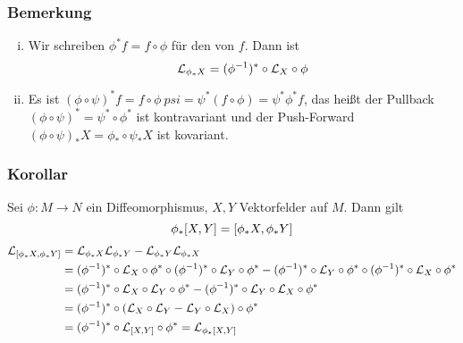 \subsubsection{Bemerkung}
\label{ssub:164}
\begin{enumerate}[(i)]
\item Wir schreiben $\phi^* f = f\circ \phi$ für den  von $f$. Dann ist
\[
\mathcal{L}_{\phi_* X} = (\phi^{-1})^* \circ \mathcal{L}_X \circ \phi
\]
\item Es ist $(\phi\circ \psi)^* f = f\circ \phi\ psi = \psi^*(f\circ \phi) = \psi^* \phi^* f$, das heißt der Pullback $(\phi\circ \psi)^* = \psi^* \circ \phi^*$ ist kontravariant und der Push-Forward $(\phi\circ \psi)_* X = \phi_* \circ \psi_* X$ ist kovariant.
\end{enumerate}

\subsubsection{Korollar}
\label{ssub:165}
Sei $\phi: M\to N$ ein Diffeomorphismus, $X,Y$ Vektorfelder auf $M$. Dann gilt
\[
\phi_*\benbrace*{X,Y} = \benbrace{\phi_* X,\phi_* Y}
\]
\begin{align*}
\mathcal{L}_{[\phi_* X, \phi_* Y]} &= \mathcal{L}_{\phi_* X} \mathcal{L}_{\phi_* Y} - \mathcal{L}_{\phi_* Y} \mathcal{L}_{\phi_* X}\\
&= (\phi^{-1})^* \circ \mathcal{L}_{X} \circ \phi^* \circ (\phi^{-1})^* \circ \mathcal{L}_{Y} \circ \phi^* - (\phi^{-1})^* \circ \mathcal{L}_{Y} \circ \phi^* \circ (\phi^{-1})^* \circ \mathcal{L}_{X} \circ \phi^*\\
&= (\phi^{-1})^* \circ \mathcal{L}_{X} \circ \mathcal{L}_{Y} \circ \phi^* - (\phi^{-1})^* \circ \mathcal{L}_{Y} \circ \mathcal{L}_{X} \circ \phi^*\\
&= (\phi^{-1})^* \circ (\mathcal{L}_{X} \circ \mathcal{L}_{Y} - \mathcal{L}_{Y} \circ \mathcal{L}_{X}) \circ \phi^*\\
&= (\phi^{-1})^* \circ \mathcal{L}_{[X,Y]} \circ \phi^* = \mathcal{L}_{\phi_* [X,Y]}
\end{align*}

